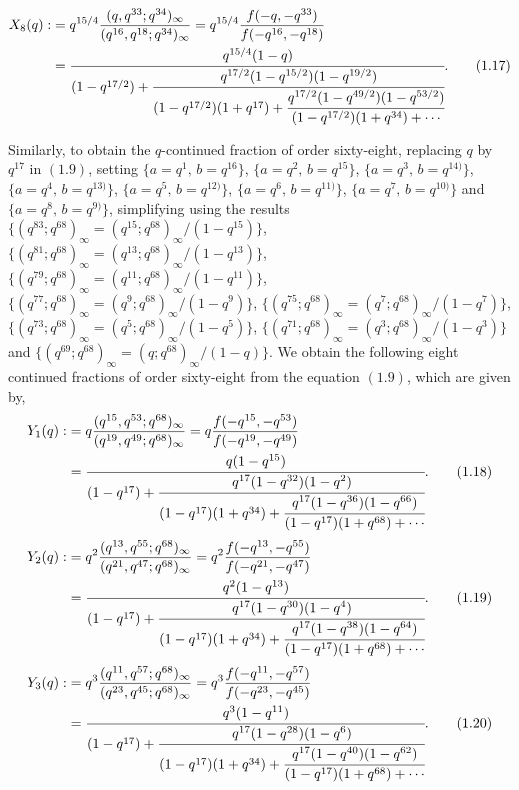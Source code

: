 \documentclass[11pt,a4paper]{article}
\numberwithin{equation}{section}
\theoremstyle{plain}
\begin{document}
	\begin{align}
		X_8(q) :&= q^{15/4}\frac{(q,q^{33};q^{34})_{\infty}}{(q^{16},q^{18};q^{34})_{\infty}}
		= q^{15/4}\frac{f(-q,-q^{33})}{f(-q^{16},-q^{18})}  \notag\\
		&=
		\cfrac{q^{15/4}(1-q)}
		{(1-q^{17/2})
			+\cfrac{q^{17/2}(1-q^{15/2})(1-q^{19/2})}
			{(1-q^{17/2})(1+q^{17})
				+\cfrac{q^{17/2}(1-q^{49/2})(1-q^{53/2})}
				{(1-q^{17/2})(1+q^{34})+\cdots}}}.
		\tag{1.17}
	\end{align}
	
	Similarly, to obtain the $q$-continued fraction of order sixty-eight, replacing $q$ by $q^{17}$ in ${(1.9)}$, setting 
	$\{a=q^{1},\, b=q^{16}\}$, $\{a=q^{2},\, b=q^{15}\}$, $\{a=q^{3},\, b=q^{14)}\}$, $\{a=q^{4},\, b=q^{13)}\}$, $\{a=q^{5},\, b=q^{12)}\}$, $\{a=q^{6},\, b=q^{11)}\}$, $\{a=q^{7},\, b=q^{10)}\}$ and $\{a=q^{8},\, b=q^{9)}\}$, simplifying using the results
$\{(q^{83};q^{68})_{\infty} = (q^{15};q^{68})_{\infty}/(1-q^{15})\}$, 
$\{(q^{81};q^{68})_{\infty} = (q^{13};q^{68})_{\infty}/(1-q^{13})\}$,
$\{(q^{79};q^{68})_{\infty} = (q^{11};q^{68})_{\infty}/(1-q^{11})\}$, 
$\{(q^{77};q^{68})_{\infty} = (q^{9};q^{68})_{\infty}/(1-q^{9})\}$,
$\{(q^{75};q^{68})_{\infty} = (q^{7};q^{68})_{\infty}/(1-q^{7})\}$, 
$\{(q^{73};q^{68})_{\infty} = (q^{5};q^{68})_{\infty}/(1-q^{5})\}$,
$\{(q^{71};q^{68})_{\infty} = (q^{3};q^{68})_{\infty}/(1-q^{3})\}$ and
$\{(q^{69};q^{68})_{\infty} = (q;q^{68})_{\infty}/(1-q)\}$.
We obtain the following eight continued fractions of order sixty-eight from the equation ${(1.9)}$, which are given by,
	\begin{align}
		Y_1(q) :&= q\frac{(q^{15},q^{53};q^{68})_{\infty}}{(q^{19},q^{49};q^{68})_{\infty}}
		= q\frac{f(-q^{15},-q^{53})}{f(-q^{19},-q^{49})}  \notag\\
		&=
		\cfrac{q(1-q^{15})}
		{(1-q^{17})
			+\cfrac{q^{17}(1-q^{32})(1-q^{2})}
			{(1-q^{17})(1+q^{34})
				+\cfrac{q^{17}(1-q^{36})(1-q^{66})}
				{(1-q^{17})(1+q^{68})+\cdots}}}.
		\tag{1.18}
	\end{align}
	\begin{align}
		Y_2(q) :&= q^{2}\frac{(q^{13},q^{55};q^{68})_{\infty}}{(q^{21},q^{47};q^{68})_{\infty}}
		= q^{2}\frac{f(-q^{13},-q^{55})}{f(-q^{21},-q^{47})}  \notag\\
		&=
		\cfrac{q^{2}(1-q^{13})}
		{(1-q^{17})
			+\cfrac{q^{17}(1-q^{30})(1-q^{4})}
			{(1-q^{17})(1+q^{34})
				+\cfrac{q^{17}(1-q^{38})(1-q^{64})}
				{(1-q^{17})(1+q^{68})+\cdots}}}.
		\tag{1.19}
	\end{align}
	\begin{align}
		Y_3(q) :&= q^{3}\frac{(q^{11},q^{57};q^{68})_{\infty}}{(q^{23},q^{45};q^{68})_{\infty}}
		= q^{3}\frac{f(-q^{11},-q^{57})}{f(-q^{23},-q^{45})}  \notag\\
		&=
		\cfrac{q^{3}(1-q^{11})}
		{(1-q^{17})
			+\cfrac{q^{17}(1-q^{28})(1-q^{6})}
			{(1-q^{17})(1+q^{34})
				+\cfrac{q^{17}(1-q^{40})(1-q^{62})}
				{(1-q^{17})(1+q^{68})+\cdots}}}.
		\tag{1.20}
	\end{align}
\end{document}
